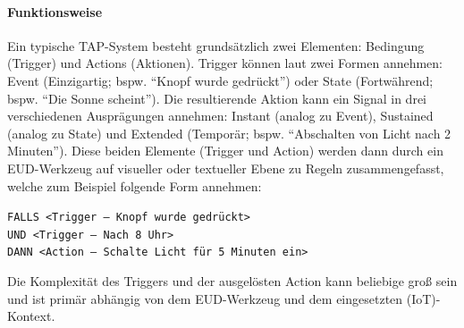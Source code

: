 \paragraph{Funktionsweise} Ein typische \ac{TAP}-System besteht grundsätzlich zwei Elementen: Bedingung (Trigger) und Actions (Aktionen). Trigger können laut \cite{huang2015supporting} zwei Formen annehmen: Event (Einzigartig; bspw. "`Knopf wurde gedrückt"') oder State (Fortwährend; bspw. "`Die Sonne scheint"'). Die resultierende Aktion kann ein Signal in drei verschiedenen Ausprägungen annehmen: Instant (analog zu Event), Sustained (analog zu State) und Extended (Temporär; bspw. "`Abschalten von Licht nach 2 Minuten"'). Diese beiden Elemente (Trigger und Action) werden dann durch ein \ac{EUD}-Werkzeug auf visueller oder textueller Ebene zu Regeln zusammengefasst, welche zum Beispiel folgende Form annehmen:

\texttt{FALLS <Trigger -- Knopf wurde gedrückt> \\ UND <Trigger -- Nach 8 Uhr> \\ DANN <Action -- Schalte Licht für 5 Minuten ein>}

Die Komplexität des Triggers und der ausgelösten Action kann beliebige groß sein und ist primär abhängig von dem \ac{EUD}-Werkzeug und dem eingesetzten (\ac{IoT})-Kontext.

